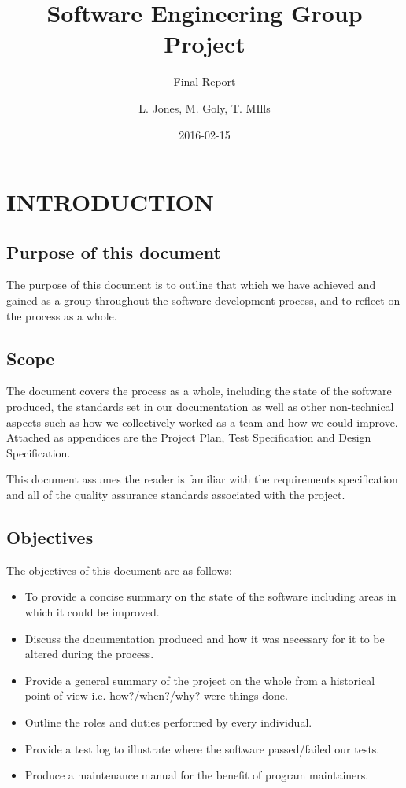 \documentclass{project}
\begin{document}
\title{Software Engineering Group Project}
\subtitle{Final Report}
\author{L. Jones, M. Goly, T. MIlls}     
\date{2016-02-15}
\maketitle
\tableofcontents 
\newpage

\section{INTRODUCTION}
\subsection{Purpose of this document}
The purpose of this document is to outline that which we have achieved and gained as a group throughout the software development process, and to reflect on the process as a whole.

\subsection{Scope}
The document covers the process as a whole, including the state of the software produced, the standards set in our documentation as well as other non-technical aspects such as how we collectively worked as a team and how we could improve. Attached as appendices are the Project Plan, Test Specification and Design Specification.

This document assumes the reader is familiar with the requirements specification\cite{se.qa.rs} and all of the quality assurance standards associated with the project.

\subsection{Objectives}
The objectives of this document are as follows:
\begin{itemize}
\item{To provide a concise summary on the state of the software including areas in which it could be improved.}
\item{Discuss the documentation produced and how it was necessary for it to be altered during the process.}
\item{Provide a general summary of the project on the whole from a historical point of view i.e. how?/when?/why? were things done.}
\item{Outline the roles and duties performed by every individual.}
\item{Provide a test log to illustrate where the software passed/failed our tests\cite{se.qa.ts}.}
\item{Produce a maintenance manual for the benefit of program maintainers.}
\end{itemize}
\clearpage
\end{document}
